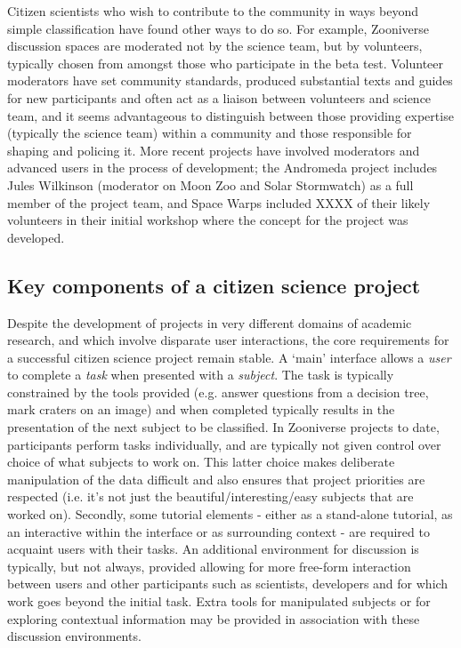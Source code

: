 \documentclass{sigchi}
\begin{document}
Citizen scientists who wish to contribute to the community in ways beyond simple classification have found other ways to do so. For example, Zooniverse discussion spaces are moderated not by the science team, but by volunteers, typically chosen from amongst those who participate in the beta test. Volunteer moderators have set community standards, produced substantial texts and guides for new participants and often act as a liaison between volunteers and science team, and it seems advantageous to distinguish between those providing expertise (typically the science team) within a community and those responsible for shaping and policing it. More recent projects have involved moderators and advanced users in the process of development; the Andromeda project includes Jules Wilkinson (moderator on Moon Zoo and Solar Stormwatch) as a full member of the project team, and Space Warps included XXXX of their likely volunteers in their initial workshop where the concept for the project was developed. 



\subsection{Key components of a citizen science project}

Despite the development of projects in very different domains of academic research, and which involve disparate user interactions, the core requirements for a successful citizen science project remain stable. A `main' interface allows a \emph{user} to complete a \emph{task} when presented with a \emph{subject}. The task is typically constrained by the tools provided (e.g. answer questions from a decision tree, mark craters on an image) and when completed typically results in the presentation of the next subject to be classified. In Zooniverse projects to date, participants perform tasks individually, and are typically not given control over choice of what subjects to work on. This latter choice makes deliberate manipulation of the data difficult and also ensures that project priorities are respected (i.e. it's not just the beautiful/interesting/easy subjects that are worked on). Secondly, some tutorial elements - either as a stand-alone tutorial, as an interactive within the interface or as surrounding context - are required to acquaint users with their tasks. An additional environment for discussion is typically, but not always, provided allowing for more free-form interaction between users and other participants such as scientists, developers and for which work goes beyond the initial task. Extra tools for manipulated subjects or for exploring contextual information may be provided in association with these discussion environments. 
\end{document}
